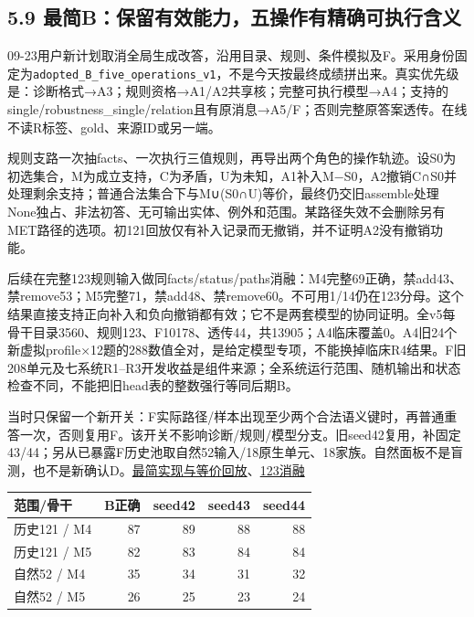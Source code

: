\documentclass[
  11pt,
  a4paper,
]{article}
\newcounter{none} %
\begin{document}
\subsection{5.9
最简B：保留有效能力，五操作有精确可执行含义}\label{ux6700ux7b80bux4fddux7559ux6709ux6548ux80fdux529bux4e94ux64cdux4f5cux6709ux7cbeux786eux53efux6267ux884cux542bux4e49}

09-23用户新计划取消全局生成改答，沿用目录、规则、条件模拟及F。采用身份固定为\texttt{adopted\_\allowbreak{}B\_\allowbreak{}five\_\allowbreak{}operations\_\allowbreak{}v1}，不是今天按最终成绩拼出来。真实优先级是：诊断格式→A3；规则资格→A1/A2共享核；完整可执行模型→A4；支持的single/robustness\_single/relation且有原消息→A5/F；否则完整原答案透传。在线不读R标签、gold、来源ID或另一端。

规则支路一次抽facts、一次执行三值规则，再导出两个角色的操作轨迹。设S0为初选集合，M为成立支持，C为矛盾，U为未知，A1补入M−S0，A2撤销C∩S0并处理剩余支持；普通合法集合下与M∪(S0∩U)等价，最终仍交旧assemble处理None独占、非法初答、无可输出实体、例外和范围。某路径失效不会删除另有MET路径的选项。初121回放仅有补入记录而无撤销，并不证明A2没有撤销功能。

后续在完整123规则输入做同facts/status/paths消融：M4完整69正确，禁add43、禁remove53；M5完整71，禁add48、禁remove60。不可用1/14仍在123分母。这个结果直接支持正向补入和负向撤销都有效；它不是两套模型的协同证明。全v5每骨干目录3560、规则123、F10178、透传44，共13905；A4临床覆盖0。A4旧24个新虚拟profile×12题的288数值全对，是给定模型专项，不能换掉临床R4结果。F旧208单元及七系统R1--R3开发收益是组件来源；全系统运行范围、随机输出和状态检查不同，不能把旧head表的整数强行等同后期B。

当时只保留一个新开关：F实际路径/样本出现至少两个合法语义键时，再普通重答一次，否则复用F。该开关不影响诊断/规则/模型分支。旧seed42复用，补固定43/44；另从已暴露F历史池取自然52输入/18原生单元、18家族。自然面板不是盲测，也不是新确认D。\href{https://github.com/xiotakut/cf_mrg/blob/main/papers/2026-10-02_cf_moa/author_dossier/records/research/cf_moa_experiment_report.md\#L1433}{最简实现与等价回放}、\href{https://github.com/xiotakut/cf_mrg/blob/main/papers/2026-10-02_cf_moa/author_dossier/records/research/cf_moa_experiment_report.md\#L1807}{123消融}

{\def\LTcaptype{none} %
\begin{longtable}[]{@{}lrrrr@{}}
\toprule\noalign{}
范围/骨干 & B正确 & seed42 & seed43 & seed44 \\
\midrule\noalign{}
\endhead
\bottomrule\noalign{}
\endlastfoot
历史121 / M4 & 87 & 89 & 88 & 88 \\
历史121 / M5 & 82 & 83 & 84 & 84 \\
自然52 / M4 & 35 & 34 & 31 & 32 \\
自然52 / M5 & 26 & 25 & 23 & 24 \\
\end{longtable}
}
\end{document}
